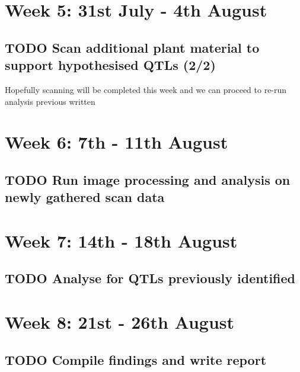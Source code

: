 \documentclass[a4paper]{article}
\begin{document}
\section{Week 5: 31st July - 4th August}
\label{sec-5}
\subsection{{\bfseries\sffamily TODO} Scan additional plant material to support hypothesised QTLs (2/2)}
\label{sec-5-1}
Hopefully scanning will be completed this week and we can proceed to re-run analysis previous written

\section{Week 6: 7th - 11th August}
\label{sec-6}
\subsection{{\bfseries\sffamily TODO} Run image processing and analysis on newly gathered scan data}
\label{sec-6-1}


\section{Week 7: 14th - 18th August}
\label{sec-7}
\subsection{{\bfseries\sffamily TODO} Analyse for QTLs previously identified}
\label{sec-7-1}

\section{Week 8: 21st - 26th August}
\label{sec-8}
\subsection{{\bfseries\sffamily TODO} Compile findings and write report}
\label{sec-8-1}
\end{document}
